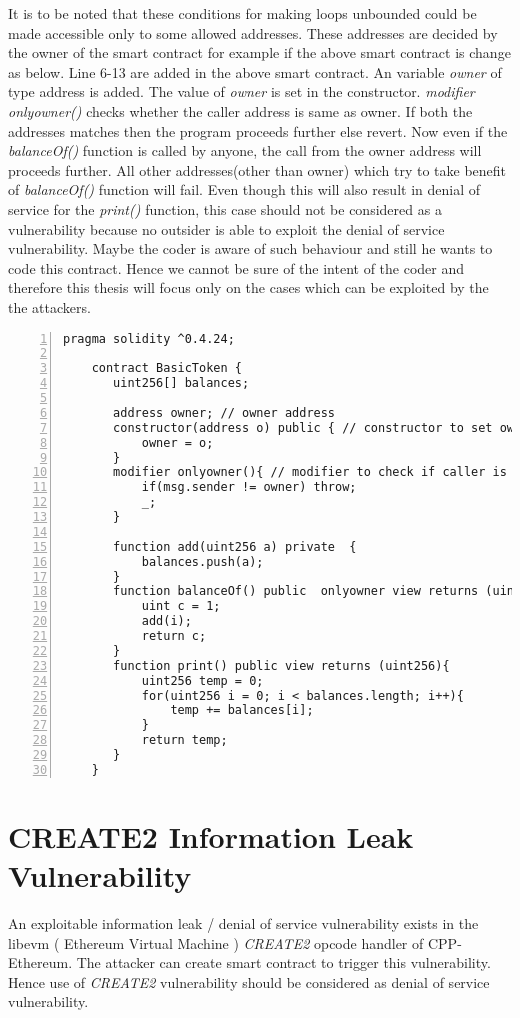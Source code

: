It is to be noted that these conditions for making loops unbounded could be made accessible only to some allowed addresses. These addresses are decided by the owner of the smart contract for example if the above smart contract is change as below. Line 6-13 are added in the above smart contract. An variable \emph{owner} of type address is added. The value of \emph{owner} is set in the constructor. \emph{modifier onlyowner()} checks whether the caller address is same as owner. If both the addresses matches then the program proceeds further else revert. Now even if the \emph{balanceOf()} function is called by anyone, the call from the owner address will proceeds further. All other addresses(other than owner) which try to take benefit of \emph{balanceOf()} function will fail. Even though this will also result in denial of service for the \emph{print()} function, this case should not be considered as a vulnerability because no outsider is able to exploit the denial of service vulnerability. Maybe the coder is aware of such behaviour and still he wants to code this contract. Hence we cannot be sure of the intent of the coder and therefore this thesis will focus only on the cases which can be exploited by the the attackers. 

\newpage
\begin{Verbatim}[numbers=left,xleftmargin=5mm]
    pragma solidity ^0.4.24;

    contract BasicToken {
       uint256[] balances;
       
       address owner; // owner address
       constructor(address o) public { // constructor to set owner
           owner = o;
       }
       modifier onlyowner(){ // modifier to check if caller is owner else revert
           if(msg.sender != owner) throw;
           _;
       }
    
       function add(uint256 a) private  {
           balances.push(a);
       }
       function balanceOf() public  onlyowner view returns (uint256) {
           uint c = 1;
           add(i);
           return c;
       }
       function print() public view returns (uint256){
           uint256 temp = 0;
           for(uint256 i = 0; i < balances.length; i++){
               temp += balances[i];
           }
           return temp;
       }
    }
\end{Verbatim}
\section{CREATE2 Information Leak Vulnerability}
An exploitable information leak / denial of service vulnerability exists in the libevm ( Ethereum Virtual Machine ) \emph{CREATE2} opcode handler of CPP-Ethereum. The attacker can create smart contract to trigger this vulnerability. Hence use of \emph{CREATE2} vulnerability should be considered as denial of service vulnerability.\cite{talos}

